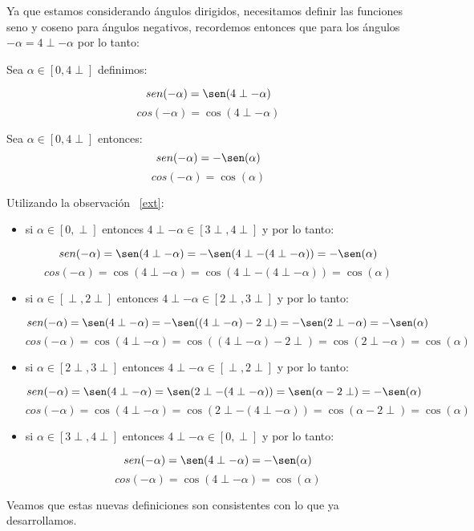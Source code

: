 Ya que estamos considerando ángulos dirigidos, necesitamos definir las funciones seno y coseno para ángulos negativos, recordemos entonces que para los ángulos $-\alpha = 4\perp - \alpha$ por lo tanto:
\begin{df} Sea $\alpha \in [0,4\perp]$ definimos:

\[sen(-\alpha)=\sen(4\perp -\alpha)\]
\[cos(-\alpha)=\cos(4\perp -\alpha)\]
\end{df}

\begin{prop}Sea $\alpha \in [0,4\perp]$ entonces:
\[sen(-\alpha)=-\sen(\alpha)\]
\[cos(-\alpha)=\cos(\alpha)\]
\end{prop}
\begin{pba}
Utilizando la observación ~\ref{ext}:
\begin{itemize}
\item si $\alpha \in [0,\perp]$ entonces $4\perp -\alpha \in [3\perp,4\perp]$ y por lo tanto:
 
\[sen(-\alpha)=\sen(4\perp -\alpha)=-\sen(4\perp-(4\perp - \alpha))=-\sen(\alpha)\]
\[cos(-\alpha)=\cos(4\perp -\alpha)= \cos(4\perp-(4\perp - \alpha))= \cos(\alpha)\]
     
\item si $\alpha \in [\perp,2\perp]$ entonces $4\perp -\alpha \in [2\perp,3\perp]$ y por lo tanto:
 
\[sen(-\alpha)=\sen(4\perp -\alpha)=-\sen((4\perp-\alpha) - 2\perp)=-\sen(2\perp - \alpha)=-\sen(\alpha)\]
\[cos(-\alpha)=\cos(4\perp -\alpha)= \cos((4\perp-\alpha) - 2\perp)= \cos(2\perp - \alpha)=\cos(\alpha)\]
     
\item si $\alpha \in [2\perp,3\perp]$ entonces $4\perp -\alpha \in [\perp,2\perp]$ y por lo tanto:
 
\[sen(-\alpha)=\sen(4\perp -\alpha)= \sen(2\perp -(4\perp - \alpha))= \sen(\alpha - 2\perp)=-\sen(\alpha)\]
\[cos(-\alpha)=\cos(4\perp -\alpha)= \cos(2\perp -(4\perp - \alpha))= \cos(\alpha - 2\perp)=\cos(\alpha)\] 
     
\item si $\alpha \in [3\perp,4\perp]$ entonces $4\perp -\alpha \in [0,\perp]$ y por lo tanto:
 
\[sen(-\alpha)=\sen(4\perp -\alpha)= -\sen(\alpha)\]
\[cos(-\alpha)=\cos(4\perp -\alpha)= \cos(\alpha)\]
\end{itemize}     
\end{pba}

Veamos que estas nuevas definiciones son consistentes con lo que ya desarrollamos. 

